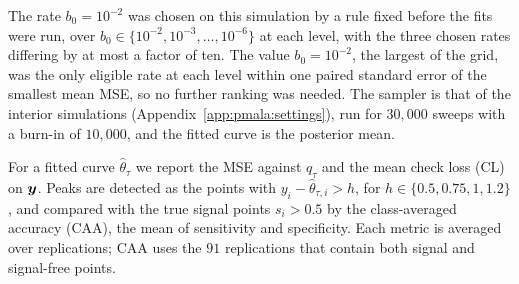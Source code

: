 The rate $b_0=10^{-2}$ was chosen on this simulation by a rule fixed before the fits were run, over $b_0\in\{10^{-2},10^{-3},\dots,10^{-6}\}$ at each level, with the three chosen rates differing by at most a factor of ten. The value $b_0=10^{-2}$, the largest of the grid, was the only eligible rate at each level within one paired standard error of the smallest mean MSE, so no further ranking was needed. The sampler is that of the interior simulations (Appendix~\ref{app:pmala:settings}), run for $30{,}000$ sweeps with a burn-in of $10{,}000$, and the fitted curve is the posterior mean.

For a fitted curve $\widehat\theta_\tau$ we report the MSE against $q_\tau$ and the mean check loss (CL) on $\bm{y}$. Peaks are detected as the points with $y_i-\widehat\theta_{\tau,i}>h$, for $h\in\{0.5,0.75,1,1.2\}$, and compared with the true signal points $s_i>0.5$ by the class-averaged accuracy (CAA), the mean of sensitivity and specificity. Each metric is averaged over replications; CAA uses the $91$ replications that contain both signal and signal-free points.

